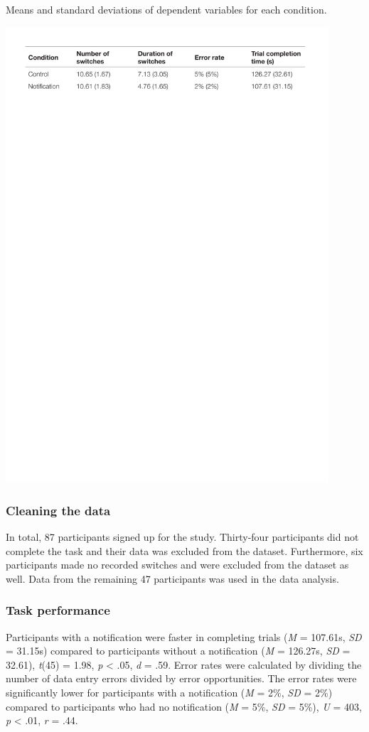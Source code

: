 \begin{table}
\caption{Means and standard deviations of dependent variables for each condition.}
\centering
\includegraphics[width=0.9\textwidth]{images/ch56/ch56-descstats.pdf}
\vspace{-3pt}
\label{tbl:ch56-Table1}
\end{table}

\subsubsection{Cleaning the data}
In total, 87 participants signed up for the study. Thirty-four participants did not complete the task and their data was excluded from the dataset.
Furthermore, six participants made no recorded switches and were excluded from the dataset as well. Data from the remaining 47 participants was used in the data analysis.

\subsubsection{Task performance}
Participants with a notification were faster in completing trials (\textit{M} = 107.61s, \textit{SD} = 31.15s) compared to participants without a notification (\textit{M} = 126.27s, \textit{SD} = 32.61), \textit{t}(45) = 1.98, \textit{p} < .05, \textit{d} = .59.
Error rates were calculated by dividing the number of data entry errors divided by error opportunities. The error rates were significantly lower for participants with a notification (\textit{M }= 2\%, \textit{SD} = 2\%) compared to participants who had no notification (\textit{M} = 5\%, \textit{SD }= 5\%), \textit{U} = 403, \textit{p} < .01, \textit{r} = .44. 

